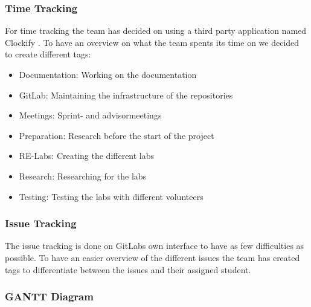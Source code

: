 \subsubsection*{Time Tracking}
For time tracking the team has decided on using a third party application named Clockify \cite{clockify}. To have an overview on what the team spents its time on we decided to create different tags: 
\begin{itemize}
    \item Documentation: Working on the documentation
    \item GitLab: Maintaining the infrastructure of the repositories
    \item Meetings: Sprint- and advisormeetings
    \item Preparation: Research before the start of the project
    \item RE-Labs: Creating the different labs
    \item Research: Researching for the labs
    \item Testing: Testing the labs with different volunteers
\end{itemize}

\subsubsection*{Issue Tracking}
The issue tracking is done on GitLabs own interface to have as few difficulties as possible. To have an easier overview of the different issues the team has created tags to differentiate between the issues and their assigned student. 



\subsubsection*{GANTT Diagram}

